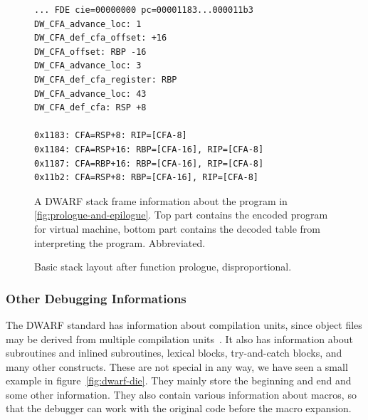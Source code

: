 \begin{figure}
    \begin{lstlisting}
... FDE cie=00000000 pc=00001183...000011b3
DW_CFA_advance_loc: 1
DW_CFA_def_cfa_offset: +16
DW_CFA_offset: RBP -16
DW_CFA_advance_loc: 3
DW_CFA_def_cfa_register: RBP
DW_CFA_advance_loc: 43
DW_CFA_def_cfa: RSP +8

0x1183: CFA=RSP+8: RIP=[CFA-8]
0x1184: CFA=RSP+16: RBP=[CFA-16], RIP=[CFA-8]
0x1187: CFA=RBP+16: RBP=[CFA-16], RIP=[CFA-8]
0x11b2: CFA=RSP+8: RBP=[CFA-16], RIP=[CFA-8]
    \end{lstlisting}
    \caption{A DWARF stack frame information about the program in
             \ref{fig:prologue-and-epilogue}. Top part contains the encoded
             program for virtual machine, bottom part contains the decoded
             table from interpreting the program. Abbreviated.}
    \label{fig:dwarf-stack-frames}
\end{figure}

\begin{figure}
    \centering
    \caption{Basic stack layout after function prologue, disproportional.}
    \label{fig:stack-layout}
\end{figure}

\subsubsection{Other Debugging Informations}
The DWARF standard has information about compilation units, since object files
may be derived from multiple compilation units~\cite{dwarf}. It also has
information about subroutines and inlined subroutines, lexical blocks,
try-and-catch blocks, and many other constructs. These are not special in any
way, we have seen a small example in figure~\ref{fig:dwarf-die}. They mainly
store the beginning and end and some other information. They also contain
various information about macros, so that the debugger can work with the
original code before the macro expansion.


